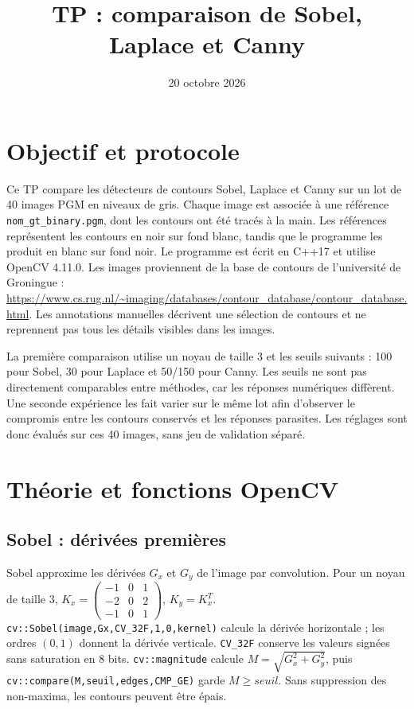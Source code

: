 \documentclass[a4paper,11pt]{article}
\title{TP : comparaison de Sobel, Laplace et Canny}
\author{}\date{20 octobre 2026}
\begin{document}
\maketitle

\section{Objectif et protocole}
Ce TP compare les détecteurs de contours Sobel, Laplace et Canny sur un lot de
40 images PGM en niveaux de gris. Chaque image est associée à une référence
\texttt{nom\_gt\_binary.pgm}, dont les contours ont été tracés à la main.
Les références représentent les contours en noir sur fond blanc, tandis que
le programme les produit en blanc sur fond noir.
Le programme est écrit en C++17 et utilise OpenCV 4.11.0.
Les images proviennent de la base de contours de l'université de Groningue :
\url{https://www.cs.rug.nl/~imaging/databases/contour_database/contour_database.html}.
Les annotations manuelles décrivent une sélection de contours et ne reprennent
pas tous les détails visibles dans les images.

La première comparaison utilise un noyau de taille 3 et les seuils suivants :
100 pour Sobel, 30 pour Laplace et 50/150 pour Canny. Les seuils ne sont pas directement comparables entre méthodes,
car les réponses numériques diffèrent. Une seconde expérience les fait varier
sur le même lot afin d'observer le compromis entre les contours conservés
et les réponses parasites. Les réglages sont donc évalués sur ces 40 images,
sans jeu de validation séparé.

\section{Théorie et fonctions OpenCV}
\subsection{Sobel : dérivées premières}
Sobel approxime les dérivées $G_x$ et $G_y$ de l'image par convolution.
Pour un noyau de taille 3,
$K_x=\left(\begin{smallmatrix}-1&0&1\\-2&0&2\\-1&0&1\end{smallmatrix}\right)$,
$K_y=K_x^T$. \texttt{cv::Sobel(image,Gx,CV\_32F,1,0,kernel)} calcule la dérivée
horizontale ; les ordres $(0,1)$ donnent la dérivée verticale.
\texttt{CV\_32F} conserve les valeurs signées sans saturation en 8 bits.
\texttt{cv::magnitude} calcule $M=\sqrt{G_x^2+G_y^2}$, puis
\texttt{cv::compare(M,seuil,edges,CMP\_GE)} garde $M\geq seuil$.
Sans suppression des non-maxima, les contours peuvent être épais.
\end{document}
